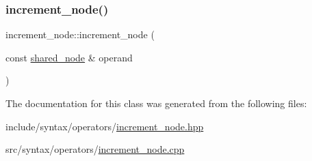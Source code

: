 \subsubsection{\texorpdfstring{increment\+\_\+node()}{increment\_node()}}
{\footnotesize\ttfamily increment\+\_\+node\+::increment\+\_\+node (\begin{DoxyParamCaption}\item[{const \hyperlink{namespacejawe_a3f307481d921b6cbb50cc8511fc2b544}{shared\+\_\+node} \&}]{operand }\end{DoxyParamCaption})}



The documentation for this class was generated from the following files\+:\begin{DoxyCompactItemize}
\item 
include/syntax/operators/\hyperlink{increment__node_8hpp}{increment\+\_\+node.\+hpp}\item 
src/syntax/operators/\hyperlink{increment__node_8cpp}{increment\+\_\+node.\+cpp}\end{DoxyCompactItemize}
